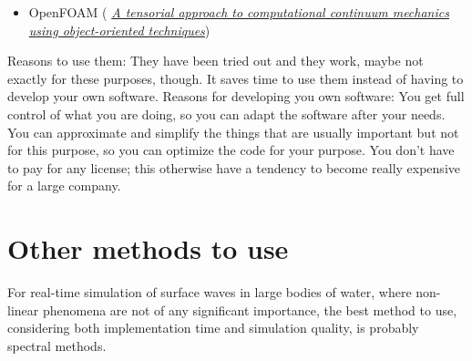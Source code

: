 \begin{itemize}
    \item OpenFOAM ( \textit{\href{http://powerlab.fsb.hr/ped/kturbo/openfoam/docs/foam.pdf}{A tensorial approach to computational continuum mechanics using object-oriented techniques}})
\end{itemize}

Reasons to use them: They have been tried out and they work, maybe not exactly for these purposes, though. It saves time to use them instead of having to develop your own software. Reasons for developing you own software: You get full control of what you are doing, so you can adapt the software after your needs. You can approximate and simplify the things that are usually important but not for this purpose, so you can optimize the code for your purpose. You don't have to pay for any license; this otherwise have a tendency to become really expensive for a large company.

\section{Other methods to use}

For real-time simulation of surface waves in large bodies of water, where non-linear phenomena are not of any significant importance, the best method to use, considering both implementation time and simulation quality, is probably spectral methods.
